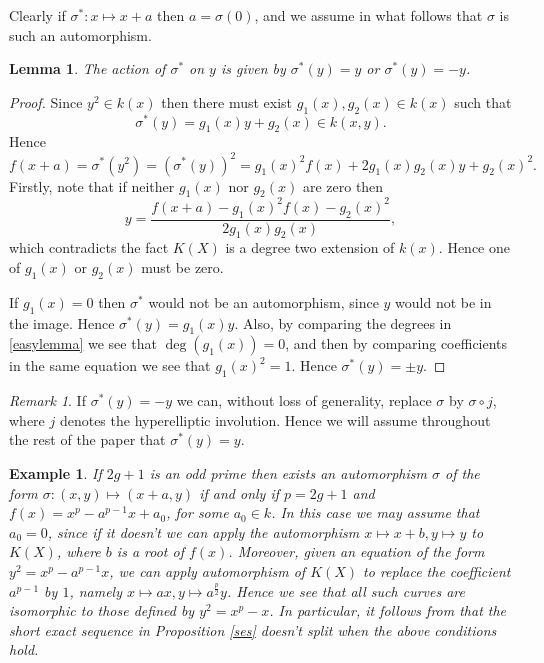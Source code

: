 \documentclass[11pt]{article} %
\theoremstyle{plain}
\newtheorem{lem}[defn]{Lemma}
\newtheorem{ex}[defn]{Example}
\theoremstyle{remark}
\newtheorem*{rem}{Remark}
\begin{document}
Clearly if $\sigma^* \colon x \mapsto x+a$ then $a = \sigma(0)$, and we assume in what follows that $\sigma$ is such an automorphism.
\begin{lem}
The action of $\sigma^*$ on $y$ is given by $\sigma^*(y) = y$ or $\sigma^*(y) = -y$.
\end{lem}
\begin{proof}
Since $y^2 \in k(x)$ then there must exist $g_1(x), g_2(x) \in k(x)$ such that 
\begin{equation*}
\sigma^*(y) = g_1(x)y + g_2(x) \in k(x,y).
\end{equation*}
Hence
\begin{equation}\label{easylemma}
f(x+a) = \sigma^*(y^2) = (\sigma^*(y))^2 = g_1(x)^2f(x)+2g_1(x)g_2(x)y + g_2(x)^2.
\end{equation}
Firstly, note that if neither $g_1(x)$ nor $g_2(x)$ are zero then
\[
y = \frac{f(x+a) - g_1(x)^2f(x) - g_2(x)^2}{2g_1(x)g_2(x)},
\]
which contradicts the fact $K(X)$ is a degree two extension of $k(x)$.
Hence one of $g_1(x)$ or $g_2(x)$ must be zero.

If $g_1(x) = 0$ then $\sigma^*$ would not be an automorphism, since $y$ would not be in the image.
Hence $\sigma^*(y) = g_1(x)y$.
Also, by comparing the degrees in \eqref{easylemma} we see that $\deg(g_1(x)) = 0$, and then by comparing coefficients in the same equation we see that $g_1(x)^2 = 1$.
Hence $\sigma^*(y) = \pm y$.
\end{proof}
\begin{rem}
If $\sigma^*(y) = -y$ we can, without loss of generality, replace $\sigma$ by $\sigma \circ j$, where $j$ denotes the hyperelliptic involution.
Hence we will assume throughout the rest of the paper that $\sigma^*(y) = y$.
\end{rem}

\begin{ex}
If $2g+1$ is an odd prime then exists an automorphism $\sigma$ of the form $\sigma\colon (x,y) \mapsto (x+a,y)$ if and only if $p=2g+1$ and $f(x) = x^p - a^{p-1}x + a_0$, for some $a_0 \in k$.
In this case we may assume that $a_0 = 0$, since if it doesn't we can apply the automorphism $x \mapsto x+b, y\mapsto y$ to $K(X)$, where $b$ is a root of $f(x)$.
Moreover, given an equation of the form $y^2 = x^p - a^{p-1}x$, we can apply automorphism of $K(X)$ to replace the coefficient $a^{p-1}$ by $1$, namely $x \mapsto ax, y \mapsto a^{\frac{p}{2}}y$.
Hence we see that all such curves are isomorphic to those defined by $y^2 = x^p - x$.
In particular, it follows from \cite{canonicalrepresentation} that the short exact sequence in Proposition \ref{ses} doesn't split when the above conditions hold.
\end{ex}
\end{document}
